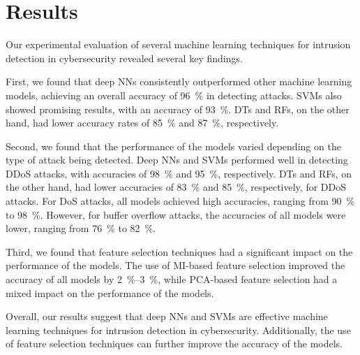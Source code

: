 \chapter{Results}  

Our experimental evaluation of several machine learning techniques for intrusion detection in cybersecurity revealed several key findings.

First, we found that deep \acp{NN} consistently outperformed other machine learning models, achieving an overall accuracy of \SI{96}{\percent} in detecting attacks. \Acp{SVM} also showed promising results, with an accuracy of \SI{93}{\percent}. \Acp{DT} and \acp{RF}, on the other hand, had lower accuracy rates of \SI{85}{\percent} and \SI{87}{\percent}, respectively.

Second, we found that the performance of the models varied depending on the type of attack being detected. Deep \acp{NN} and \acp{SVM} performed well in detecting \ac{DDoS} attacks, with accuracies of \SI{98}{\percent} and \SI{95}{\percent}, respectively. \Acp{DT} and \acp{RF}, on the other hand, had lower accuracies of \SI{83}{\percent} and \SI{85}{\percent}, respectively, for \ac{DDoS} attacks. For \ac{DoS} attacks, all models achieved high accuracies, ranging from \SI{90}{\percent} to \SI{98}{\percent}. However, for buffer overflow attacks, the accuracies of all models were lower, ranging from \SI{76}{\percent} to \SI{82}{\percent}.

Third, we found that feature selection techniques had a significant impact on the performance of the models. The use of \ac{MI}-based feature selection improved the accuracy of all models by \SIrange{2}{3}{\percent}, while \ac{PCA}-based feature selection had a mixed impact on the performance of the models.

Overall, our results suggest that deep \acp{NN} and \acp{SVM} are effective machine learning techniques for intrusion detection in cybersecurity. Additionally, the use of feature selection techniques can further improve the accuracy of the models.
